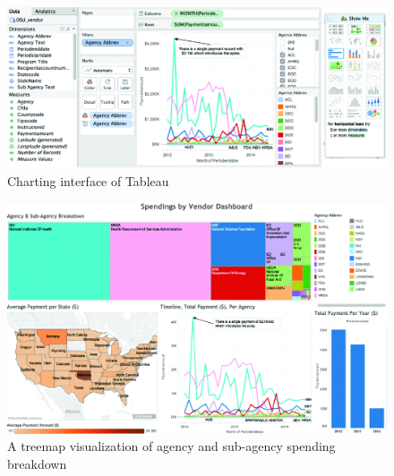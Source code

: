 \documentclass[]{krantz}
\begin{document}
\begin{figure}

{\centering \includegraphics[width=0.7\linewidth]{ChapterViz/figures/fig9-3a} 

}

\caption{Charting interface of Tableau}\label{fig:fig9-3a}
\end{figure}

\begin{figure}

{\centering \includegraphics[width=0.7\linewidth]{ChapterViz/figures/fig9-3b} 

}

\caption{A treemap visualization of agency and sub-agency spending breakdown}\label{fig:fig9-3b}
\end{figure}
\end{document}
